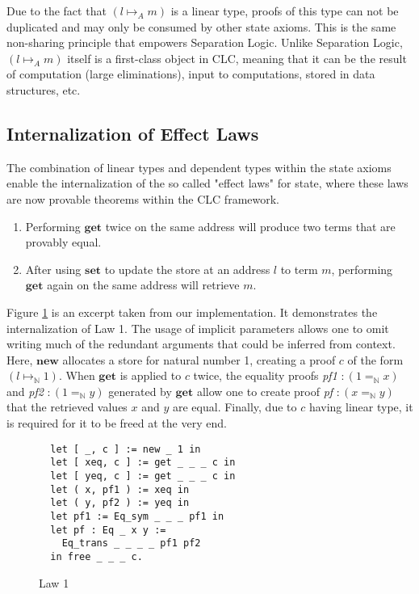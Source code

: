 \documentclass[sigplan,screen]{acmart}
\theoremstyle{definition}
\newcommand{\new}{\textbf{new}}
\newcommand{\get}{\textbf{get}}
\newcommand{\set}{\textbf{set}}
\begin{document}
  Due to the fact that $(l \mapsto_A m)$ is a linear type, proofs of this type can not be duplicated and may only be consumed by other state axioms. This is the same non-sharing principle that empowers Separation Logic. Unlike Separation Logic, $(l \mapsto_A m)$ itself is a first-class object in CLC, meaning that it can be the result of computation (large eliminations), input to computations, stored in data structures, etc.

  \subsection{Internalization of Effect Laws}
  The combination of linear types and dependent types within the state axioms enable the internalization of the so called "effect laws" for state, where these laws are now provable theorems within the CLC framework.

  \begin{enumerate}
    \item Performing $\get$ twice on the same address will produce two terms that are provably equal.
    \item After using $\set$ to update the store at an address $l$ to term $m$, performing $\get$ again on the same address will retrieve $m$.
  \end{enumerate}

  Figure \ref{law1} is an excerpt taken from our implementation. It demonstrates the internalization of Law 1. The usage of implicit parameters allows one to omit writing much of the redundant arguments that could be inferred from context. Here, $\new$ allocates a store for natural number 1, creating a proof $c$ of the form $(l \mapsto_\mathbb{N} 1)$. When $\get$ is applied to $c$ twice, the equality proofs \textit{pf1} $: (1 =_\mathbb{N} x)$ and \textit{pf2} $: (1 =_\mathbb{N} y)$ generated by $\get$ allow one to create proof \textit{pf} $: (x =_\mathbb{N} y)$ that the retrieved values $x$ and $y$ are equal. Finally, due to $c$ having linear type, it is required for it to be freed at the very end.

  \begin{figure}[h]
  \vspace{-0.6em}
  \caption{Law 1}
  \begin{lstlisting}
  let [ _, c ] := new _ 1 in
  let [ xeq, c ] := get _ _ _ c in
  let [ yeq, c ] := get _ _ _ c in
  let ( x, pf1 ) := xeq in
  let ( y, pf2 ) := yeq in
  let pf1 := Eq_sym _ _ _ pf1 in
  let pf : Eq _ x y := 
    Eq_trans _ _ _ _ pf1 pf2 
  in free _ _ _ c.
  \end{lstlisting}
  \vspace{-0.6em}
  \label{law1}
  \Description{}
  \end{figure}
\end{document}
